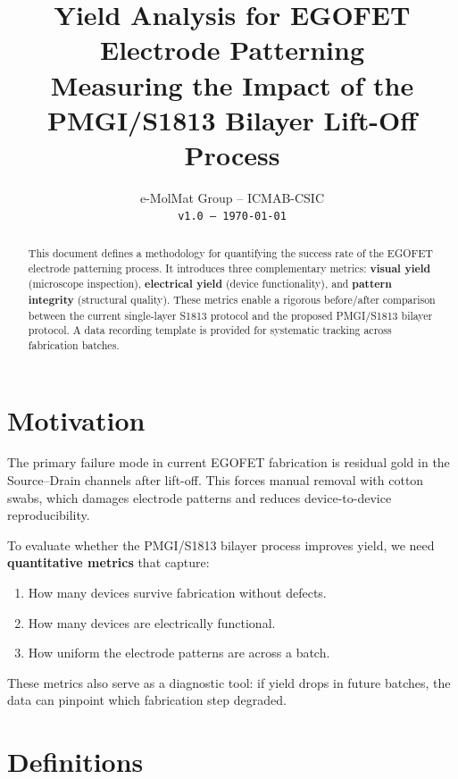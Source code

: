 \documentclass[11pt,a4paper]{article}
\title{
    \vspace{-1cm}
    \textbf{Yield Analysis for EGOFET Electrode Patterning} \\
    \large Measuring the Impact of the PMGI/S1813 Bilayer Lift-Off Process
}
\author{
    e-MolMat Group -- ICMAB-CSIC \\
    \texttt{v1.0 -- \today}
}
\date{}
\begin{document}
\maketitle
\thispagestyle{fancy}

\begin{abstract}
This document defines a methodology for quantifying the success rate of
the EGOFET electrode patterning process. It introduces three complementary
metrics: \textbf{visual yield} (microscope inspection), \textbf{electrical
yield} (device functionality), and \textbf{pattern integrity} (structural
quality). These metrics enable a rigorous before/after comparison between
the current single-layer S1813 protocol and the proposed PMGI/S1813
bilayer protocol. A data recording template is provided for systematic
tracking across fabrication batches.
\end{abstract}

\tableofcontents
\newpage

\section{Motivation}

The primary failure mode in current EGOFET fabrication is residual gold
in the Source--Drain channels after lift-off. This forces manual removal
with cotton swabs, which damages electrode patterns and reduces
device-to-device reproducibility.

To evaluate whether the PMGI/S1813 bilayer process improves yield, we
need \textbf{quantitative metrics} that capture:
\begin{enumerate}
    \item How many devices survive fabrication without defects.
    \item How many devices are electrically functional.
    \item How uniform the electrode patterns are across a batch.
\end{enumerate}

These metrics also serve as a diagnostic tool: if yield drops in future
batches, the data can pinpoint which fabrication step degraded.

\section{Definitions}
\end{document}
